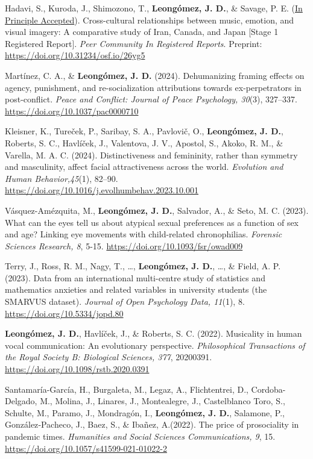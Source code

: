 \documentclass[11pt,a4paper,]{awesome-cv}
\begin{document}
Hadavi, S., Kuroda, J., Shimozono, T., \textbf{Leongómez, J. D.}, \&
Savage, P. E.
(\href{https://rr.peercommunityin.org/articles/rec?id=416}{In Principle
Accepted}). Cross-cultural relationships between music, emotion, and
visual imagery: A comparative study of Iran, Canada, and Japan {[}Stage
1 Registered Report{]}. \emph{Peer Community In Registered Reports}.
Preprint: \url{https://doi.org/10.31234/osf.io/26yg5}

\textcolor{teal}{\faStar} Martínez, C. A., \& \textbf{Leongómez, J. D.}
(2024). Dehumanizing framing effects on agency, punishment, and
re-socialization attributions towards ex-perpetrators in post-conflict.
\emph{Peace and Conflict: Journal of Peace Psychology, 30}(3), 327--337.
\url{https://doi.org/10.1037/pac0000710}

Kleisner, K., Tureček, P., Saribay, S. A., Pavlovič, O.,
\textbf{Leongómez, J. D.}, Roberts, S. C., Havlíček, J., Valentova, J.
V., Apostol, S., Akoko, R. M., \& Varella, M. A. C. (2024).
Distinctiveness and femininity, rather than symmetry and masculinity,
affect facial attractiveness across the world. \emph{Evolution and Human
Behavior,45}(1), 82--90.
\href{https://authors.elsevier.com/c/1hyfr3tz492kal}{https://doi.org/10.1016/j.evolhumbehav.2023.10.001}

Vásquez-Amézquita, M., \textbf{Leongómez, J. D.}, Salvador, A., \& Seto,
M. C. (2023). What can the eyes tell us about atypical sexual
preferences as a function of sex and age? Linking eye movements with
child-related chronophilias. \emph{Forensic Sciences Research, 8}, 5-15.
\url{https://doi.org/10.1093/fsr/owad009}

Terry, J., Ross, R. M., Nagy, T., \ldots, \textbf{Leongómez, J. D.},
\ldots, \& Field, A. P. (2023). Data from an international multi-centre
study of statistics and mathematics anxieties and related variables in
university students (the SMARVUS dataset). \emph{Journal of Open
Psychology Data, 11}(1), 8. \url{https://doi.org/10.5334/jopd.80}

\textcolor{teal}{\faStar} \textbf{Leongómez, J. D.}, Havlíček, J., \&
Roberts, S. C. (2022). Musicality in human vocal communication: An
evolutionary perspective. \emph{Philosophical Transactions of the Royal
Society B: Biological Sciences, 377}, 20200391.
\url{https://doi.org/10.1098/rstb.2020.0391}

Santamaría-García, H., Burgaleta, M., Legaz, A., Flichtentrei, D.,
Cordoba-Delgado, M., Molina, J., Linares, J., Montealegre, J.,
Castelblanco Toro, S., Schulte, M., Paramo, J., Mondragón, I.,
\textbf{Leongómez, J. D.}, Salamone, P., González‑Pacheco, J., Baez, S.,
\& Ibañez, A.(2022). The price of prosociality in pandemic times.
\emph{Humanities and Social Sciences Communications, 9}, 15.
\url{https://doi.org/10.1057/s41599-021-01022-2}
\end{document}
